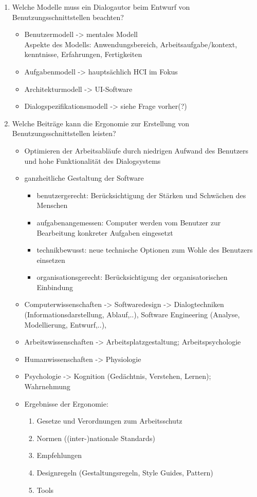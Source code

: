 \begin{enumerate}
	\item Welche Modelle muss ein Dialogautor beim Entwurf von Benutzungsschnittstellen beachten?
	\begin{itemize}
		\item Benutzermodell -> mentales Modell \\
		Aspekte des Modells: Anwendungsbereich, Arbeitsaufgabe/kontext, kenntnisse, Erfahrungen, Fertigkeiten
		\item Aufgabenmodell -> hauptsächlich HCI im Fokus
		\item Architekturmodell -> UI-Software
		\item Dialogspezifikationsmodell -> siehe Frage vorher(?)
	\end{itemize}
	
	\item Welche Beiträge kann die Ergonomie zur Erstellung von Benutzungsschnittstellen leisten?
	\begin{itemize}
		\item Optimieren der Arbeitsabläufe durch niedrigen Aufwand des Benutzers und hohe Funktionalität des Dialogsystems
		\item ganzheitliche Gestaltung der Software
		\begin{itemize}
			\item benutzergerecht: Berücksichtigung der Stärken und Schwächen des Menschen
			\item aufgabenangemessen: Computer werden vom Benutzer zur Bearbeitung konkreter Aufgaben eingesetzt
			\item technikbewusst: neue technische Optionen zum Wohle des Benutzers einsetzen
			\item organisationsgerecht: Berücksichtigung der organisatorischen Einbindung
		\end{itemize}
		\item Computerwissenschaften -> Softwaredesign -> Dialogtechniken (Informationsdarstellung, Ablauf,..), Software Engineering (Analyse, Modellierung, Entwurf,..), 
		\item Arbeitswissenschaften -> Arbeitsplatzgestaltung; Arbeitspsychologie
		\item Humanwissenschaften -> Physiologie
		\item Psychologie -> Kognition (Gedächtnis, Verstehen, Lernen); Wahrnehmung 
		\item Ergebnisse der Ergonomie:
		\begin{enumerate}
			\item Gesetze und Verordnungen zum Arbeitsschutz
			\item Normen ((inter-)nationale Standards)
			\item Empfehlungen
			\item Designregeln (Gestaltungsregeln, Style Guides, Pattern)
			\item Tools 
		\end{enumerate}
	\end{itemize}
\end{enumerate}



